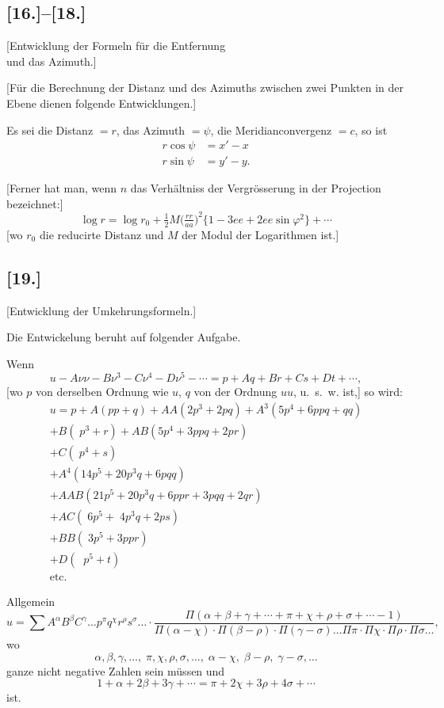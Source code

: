 \documentclass[12pt,a4paper]{article}
\begin{document}
\newpage
\subsection*{[16.]--[18.]}
\begin{center}
[Entwicklung der Formeln für die Entfernung\\und das Azimuth.]
\end{center}

[Für die Berechnung der Distanz und des Azimuths zwischen zwei Punkten in der Ebene dienen folgende Entwicklungen.]

Es sei die Distanz $=r$, das Azimuth $=\psi$, die Meridianconvergenz $=c$, so ist
\begin{align*}
r\cos\psi &= x'-x\\
r\sin\psi &= y'-y.
\end{align*}

[Ferner hat man, wenn $n$ das Verhältniss der Vergrösserung in der Projection bezeichnet:]
\[
\log r = \log r_0 + \tfrac{1}{2}M\bigl(\tfrac{rr}{aa}\bigr)^2\{1-3ee+2ee\sin\varphi^2\} + \cdots
\]
[wo $r_0$ die reducirte Distanz und $M$ der Modul der Logarithmen ist.]

\subsection*{[19.]}
\begin{center}
[Entwicklung der Umkehrungsformeln.]
\end{center}

Die Entwickelung beruht auf folgender Aufgabe.

Wenn
\[
u - A\nu\nu - B\nu^3 - C\nu^4 - D\nu^5 - \cdots = p + Aq + Br + Cs + Dt + \cdots,
\]
[wo $p$ von derselben Ordnung wie $u$, $q$ von der Ordnung $uu$, u.~s.~w. ist,] so wird:
\begin{multline*}
u = p + A(pp+q) + AA(2p^3+2pq) + A^3(5p^4+6ppq+qq)\\
+ B(\;p^3+r) + AB(5p^4+3ppq+2pr)\\
+ C(\;p^4+s)\\
+ A^4(14p^5+20p^3q+6pqq)\\
+ AAB(21p^5+20p^3q+6ppr+3pqq+2qr)\\
+ AC(\;6p^5+\;4p^3q+2ps)\\
+ BB(\;3p^5+3ppr)\\
+ D(\;\;p^5+t)\\
\text{etc.}
\end{multline*}

Allgemein
\[
u = \sum A^{\alpha}B^{\beta}C^{\gamma}\ldots p^{\pi}q^{\chi}r^{\rho}s^{\sigma}\ldots\cdot\frac{\Pi(\alpha+\beta+\gamma+\cdots+\pi+\chi+\rho+\sigma+\cdots-1)}{\Pi(\alpha-\chi)\cdot\Pi(\beta-\rho)\cdot\Pi(\gamma-\sigma)\ldots\Pi\pi\cdot\Pi\chi\cdot\Pi\rho\cdot\Pi\sigma\ldots},
\]
wo
\[
\alpha,\beta,\gamma,\ldots,\;\pi,\chi,\rho,\sigma,\ldots,\;\alpha-\chi,\;\beta-\rho,\;\gamma-\sigma,\ldots
\]
ganze nicht negative Zahlen sein müssen und
\[
1+\alpha+2\beta+3\gamma+\cdots = \pi+2\chi+3\rho+4\sigma+\cdots
\]
ist.
\end{document}
